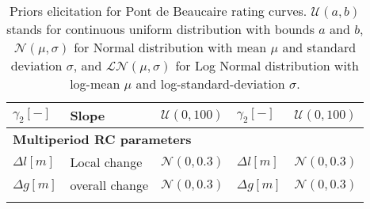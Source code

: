 \begin{table}[h!]
\begin{tabular}{|l|l|l|l|l|}
            $\gamma_{2} [-]$ & Slope & $\mathcal{U}(0,100)$ & $\gamma_{2} [-]$ &$\mathcal{U}(0,100)$  \\
            \hline
            \multicolumn{5}{|l|}{\textbf{Multiperiod RC parameters}} \\
            $\Delta l [m]$     &   Local change    &  $\mathcal{N}(0,0.3)$&      $\Delta l [m]$     &$\mathcal{N}(0,0.3)$\\
            $\Delta g [m]$     &   overall change       &  $\mathcal{N}(0,0.3)$&      $\Delta g [m]$     &$\mathcal{N}(0,0.3)$\\
            \lasthline
        \end{tabular} 
        \caption{Priors elicitation for Pont de Beaucaire rating curves. $\mathcal{U}(a,b)$ stands for continuous uniform distribution with bounds $a$ and $b$, $\mathcal{N}(\mu,\sigma)$ for Normal distribution with mean $\mu$  and standard deviation $\sigma$, and $\mathcal{LN}(\mu,\sigma)$ for Log Normal distribution with log-mean $\mu$ and log-standard-deviation $\sigma$.}
        \label{tab:PriorPt}
    \end{table}

